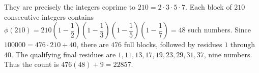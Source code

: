 They are precisely the integers coprime to $210=2\cdot3\cdot5\cdot7$. Each block of $210$ consecutive integers contains $\phi(210)=210(1-\dfrac{1}{2})(1-\dfrac{1}{3})(1-\dfrac{1}{5})(1-\dfrac{1}{7})=48$ such numbers. Since $100000=476\cdot210+40$, there are $476$ full blocks, followed by residues $1$ through $40$. The qualifying final residues are $1,11,13,17,19,23,29,31,37$, nine numbers. Thus the count is $476(48)+9=\boxed{22857}$.
